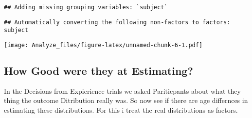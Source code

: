 \documentclass[]{article}
\begin{document}
\begin{verbatim}
## Adding missing grouping variables: `subject`
\end{verbatim}

\begin{verbatim}
## Automatically converting the following non-factors to factors: subject
\end{verbatim}

\texttt{[image: Analyze\_files/figure-latex/unnamed-chunk-6-1.pdf]}

\subsection{How Good were they at
Estimating?}\label{how-good-were-they-at-estimating}

In the Decisions from Expierience trials we asked Pariticpants about
what they thing the outcome Ditribution really was. So now see if there
are age differnces in estimating these distributions. For this i treat
the real distributions as factors.
\end{document}
